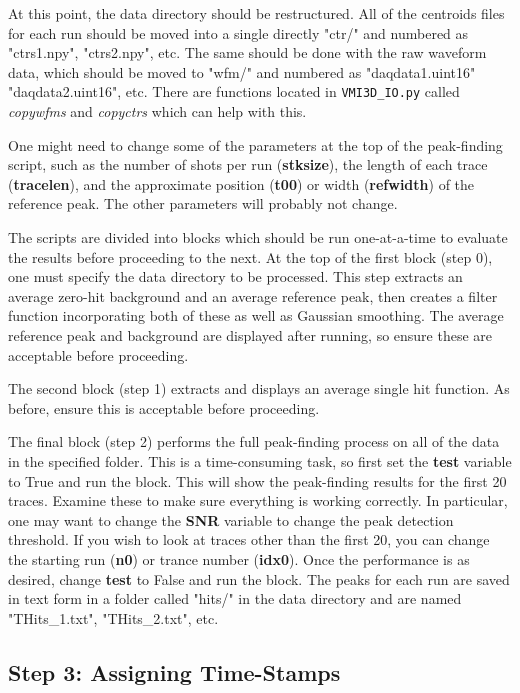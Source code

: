 \documentclass[12pt]{article}
\begin{document}
At this point, the data directory should be restructured.
All of the centroids files for each run should be moved into a single directly "ctr/" and numbered as "ctrs1.npy", "ctrs2.npy", etc.
The same should be done with the raw waveform data, which should be moved to "wfm/" and numbered as "daqdata1.uint16" "daqdata2.uint16", etc.
There are functions located in \texttt{VMI3D\_IO.py} called \textit{copywfms} and \textit{copyctrs} which can help with this.

One might need to change some of the parameters at the top of the peak-finding script, such as the number of shots per run (\textbf{stksize}), the length of each trace (\textbf{tracelen}), and the approximate position (\textbf{t00}) or width (\textbf{refwidth}) of the reference peak.
The other parameters will probably not change.

The scripts are divided into blocks which should be run one-at-a-time to evaluate the results before proceeding to the next.
At the top of the first block (step 0), one must specify the data directory to be processed.
This step extracts an average zero-hit background and an average reference peak, then creates a filter function incorporating both of these as well as Gaussian smoothing.
The average reference peak and background are displayed after running, so ensure these are acceptable before proceeding.

The second block (step 1) extracts and displays an average single hit function.
As before, ensure this is acceptable before proceeding.

The final block (step 2) performs the full peak-finding process on all of the data in the specified folder.
This is a time-consuming task, so first set the \textbf{test} variable to True and run the block.
This will show the peak-finding results for the first 20 traces.
Examine these to make sure everything is working correctly.
In particular, one may want to change the \textbf{SNR} variable to change the peak detection threshold.
If you wish to look at traces other than the first 20, you can change the starting run (\textbf{n0}) or trance number (\textbf{idx0}).
Once the performance is as desired, change \textbf{test} to False and run the block.
The peaks for each run are saved in text form in a folder called "hits/" in the data directory and are named "THits\_1.txt", "THits\_2.txt", etc.

\subsection{Step 3: Assigning Time-Stamps}
\end{document}
